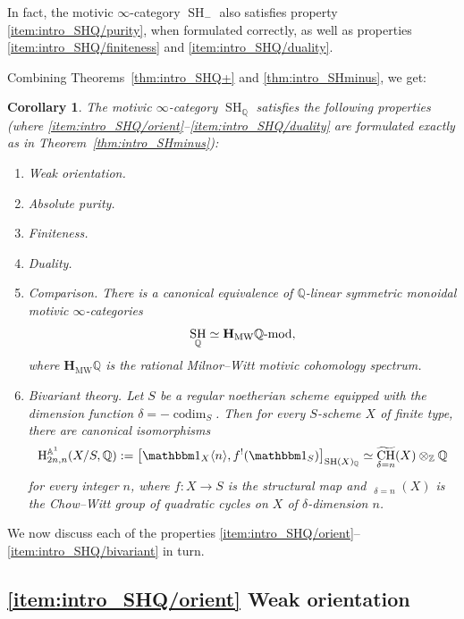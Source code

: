 \documentclass[JEP,XML,SOM,Unicode]{cedram}
\newcommand{\modl}[1]{#1\textnormal{-}\mathrm{mod}}
\renewcommand{\AA}{\mathbb A}
\newcommand{\un}{\mathbbm 1}
\newcommand{\HMW}{\mathbf H_{\mathrm{MW}}}
\newcommand{\BA}{\mathrm H^{\AA^1}}
\DeclareMathOperator{\codim}{codim}
\DeclareMathOperator{\SH}{SH}
\DeclareMathOperator{\wCH}{\widetilde{CH}}
\newcommand{\twist}[1]{\langle #1 \rangle}
\newcommand{\ZZ} {\mathbb Z}
\newcommand{\QQ} {\mathbb Q}
\newtheorem{cori}[thmi]{Corollary}
\theoremstyle{remark}
\theoremstyle{definition}
\numberwithin{equation}{thm}
\begin{document}
In fact, the motivic $\infty$-category $\SH_{-}$ also satisfies property \eqref{item:intro_SHQ/purity}, when formulated correctly, as well as properties \eqref{item:intro_SHQ/finiteness} and \eqref{item:intro_SHQ/duality}.

Combining Theorems~\ref{thm:intro_SHQ+} and \ref{thm:intro_SHminus}, we get:

\begin{cori}\label{cor:intro_SHQ}
The motivic $\infty$-category $\SH_{\QQ}$ satisfies the following properties (where \eqref{item:intro_SHQ/orient}--\eqref{item:intro_SHQ/duality} are formulated exactly as in Theorem~\ref{thm:intro_SHminus}):

\begin{enumerate}\renewcommand{\theenumi}{\Roman{enumi}}
\item\emph{Weak orientation.}\label{item:intro_SHQ/orient}
\item\emph{Absolute purity.}\label{item:intro_SHQ/purity}
\item\emph{Finiteness.}\label{item:intro_SHQ/finiteness}
\item\emph{Duality.}\label{item:intro_SHQ/duality}
\item\emph{Comparison.}\label{item:intro_SHQ/comparison}
There is a canonical equivalence of $\QQ$-linear symmetric monoidal motivic $\infty$-categories
\[
\SH_{\QQ} \simeq \modl{\HMW\QQ},
\]
where $\HMW\QQ$ is the rational Milnor--Witt motivic cohomology spectrum.
\item\emph{Bivariant theory.}\label{item:intro_SHQ/bivariant}
Let $S$ be a regular noetherian scheme equipped with the dimension function $\delta=-\codim_S$.
Then for every $S$-scheme $X$ of finite type, there are canonical isomorphisms
\[
\BA_{2n,n}(X/S, \QQ)
:= \big[ \un_X\twist{n}, f^!(\un_S) \big]_{\SH(X)_\QQ}
\simeq \wCH_{\delta=n}(X) \otimes_\ZZ \QQ
\]
for every integer $n$, where $f : X \to S$ is the structural map and $\wCH_{\delta=n}(X)$ is the Chow--Witt group of quadratic cycles on $X$ of $\delta$-dimension $n$.
\end{enumerate}
\end{cori}

We now discuss each of the properties \eqref{item:intro_SHQ/orient}--\eqref{item:intro_SHQ/bivariant} in turn.

\subsection*{\eqref{item:intro_SHQ/orient} Weak orientation}
\end{document}
